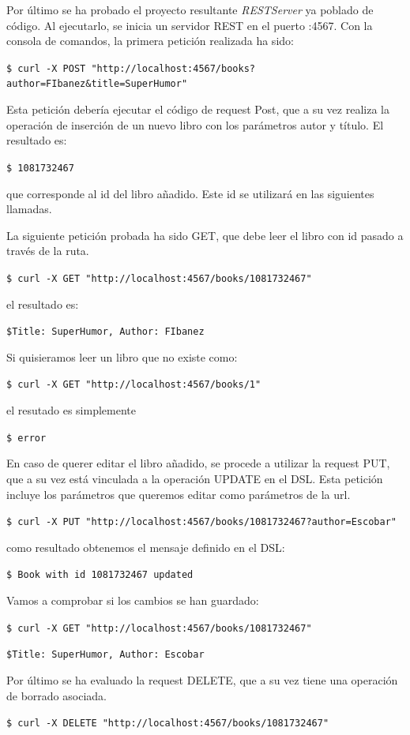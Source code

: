 \documentclass[runningheads]{llncs}
\begin{document}
Por último se ha probado el proyecto resultante \textit{RESTServer} ya poblado de código. Al ejecutarlo, se inicia un servidor REST en el puerto :4567. Con la consola de comandos, la primera petición realizada ha sido:

\texttt{\$ curl -X POST "http://localhost:4567/books?author=FIbanez\&title=SuperHumor"}

Esta petición debería ejecutar el código de request Post, que a su vez realiza la operación de inserción de un nuevo libro con los parámetros autor y título. El resultado es:

\texttt{\$ 1081732467}

que corresponde al id del libro añadido. Este id se utilizará en las siguientes llamadas.

La siguiente petición probada ha sido GET, que debe leer el libro con id pasado a través de la ruta.

\texttt{\$ curl -X GET "http://localhost:4567/books/1081732467"}

el resultado es:

\texttt{\$Title: SuperHumor, Author: FIbanez}

Si quisieramos leer un libro que no existe como:

\texttt{\$ curl -X GET "http://localhost:4567/books/1"}

el resutado es simplemente

\texttt{\$ error}

En caso de querer editar el libro añadido, se procede a utilizar la request PUT, que a su vez está vinculada a la operación UPDATE en el DSL. Esta petición incluye los parámetros que queremos editar como parámetros de la url.

\texttt{\$ curl -X PUT "http://localhost:4567/books/1081732467?author=Escobar"}

como resultado obtenemos el mensaje definido en el DSL:

\texttt{\$ Book with id 1081732467 updated}

Vamos a comprobar si los cambios se han guardado:

\texttt{\$ curl -X GET "http://localhost:4567/books/1081732467"}

\texttt{\$Title: SuperHumor, Author: Escobar}

Por último se ha evaluado la request DELETE, que a su vez tiene una operación de borrado asociada.

\texttt{\$ curl -X DELETE "http://localhost:4567/books/1081732467"}
\end{document}

